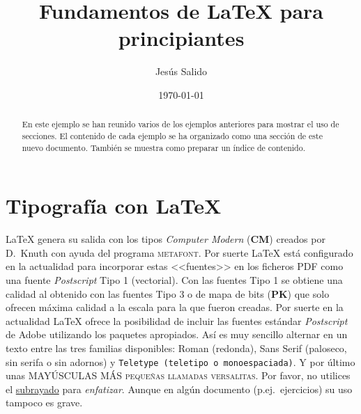 \documentclass[11pt,a4paper]{article}
\author{Jesús Salido}
\title{Fundamentos de \LaTeX{} para principiantes}
\date{\today}
\begin{document}
\maketitle 

\begin{abstract}
	En este ejemplo se han reunido varios de los ejemplos anteriores para mostrar el uso de secciones. El contenido de cada ejemplo se ha organizado como una sección de este nuevo documento. También se muestra como preparar un índice de contenido.
\end{abstract}





\section{Tipografía con \LaTeX{}}
\label{sec:tipos} %

\LaTeX{} genera su salida con los tipos \emph{Computer Modern} (\textbf{CM}) creados por D.~Knuth con ayuda del programa \textsc{metafont}. Por suerte \LaTeX{} está configurado en la actualidad para incorporar estas <<fuentes>> en los ficheros PDF como una fuente \emph{Postscript} Tipo 1 (vectorial). Con las fuentes Tipo 1 se obtiene una calidad al obtenido con las fuentes Tipo 3 o de mapa de bits (\textbf{PK}) que solo ofrecen máxima calidad a la escala para la que fueron creadas. Por suerte en la actualidad \LaTeX{} ofrece la posibilidad de incluir las fuentes estándar \emph{Postscript} de \textsf{Adobe} utilizando los paquetes apropiados. Así es muy sencillo alternar en un texto entre las tres familias disponibles: Roman (redonda), \textsf{Sans Serif (paloseco, sin serifa o sin adornos)} y \texttt{Teletype (teletipo o monoespaciada)}. Y por último unas MAYÚSCULAS MÁS \textsc{pequeñas llamadas versalitas}. Por favor, no utilices el \underline{subrayado} para \emph{enfatizar}. Aunque en algún documento (p.ej.\ ejercicios) su uso tampoco es grave.
\end{document}
